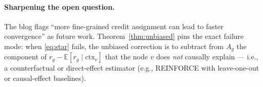 \documentclass[11pt]{article}
\begin{document}
\paragraph{Sharpening the open question.} The blog flags
``more fine-grained credit assignment can lead to faster convergence'' as
future work. Theorem~\ref{thm:unbiased} pins the exact failure mode: when
\eqref{eq:star} fails, the unbiased correction is to subtract from $A_g$ the
component of $r_g - \mathbb{E}[r_g \mid \mathrm{ctx}_v]$ that the node $v$ does
\emph{not} causally explain --- i.e., a counterfactual or direct-effect
estimator (e.g., REINFORCE with leave-one-out or causal-effect baselines).
\end{document}
